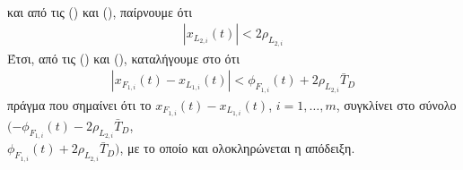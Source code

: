 \begin{proof_of_theorem}
\begin{step}
\begin{align}
\end{align}
και από τις () και (), παίρνουμε ότι
\begin{align*}
|x_{L_{2,i}}(t)| < 2\rho_{L_{2,i}}
\end{align*}
Έτσι, από τις () και (), καταλήγουμε στο ότι
\begin{align*}
|x_{F_{1,i}}(t) - x_{L_{1,i}}(t)| < \phi_{F_{1,i}}(t) + 2\rho_{L_{2,i}} \bar{T}_{D}
\end{align*}
πράγμα που σημαίνει ότι το $x_{F_{1,i}}(t) - x_{L_{1,i}}(t)$, $i=1,\ldots,m$, συγκλίνει στο σύνολο $(-\phi_{F_{1,i}}(t) - 2\rho_{L_{2,i}} \bar{T}_{D}$,\\$ \phi_{F_{1,i}}(t) + 2\rho_{L_{2,i}} \bar{T}_{D})$, με το οποίο και ολοκληρώνεται η απόδειξη.
\end{step}
\end{proof_of_theorem}

\let\cleardoublepage\clearpage

